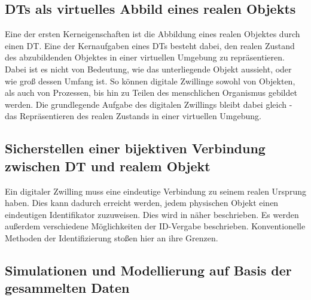 \subsection{\ac{DT}s als virtuelles Abbild eines realen Objekts}

Eine der ersten Kerneigenschaften ist die Abbildung eines realen Objektes durch einen \ac{DT}. Eine der Kernaufgaben eines \ac{DT}s besteht dabei, den realen Zustand des abzubildenden Objektes in einer virtuellen Umgebung zu repräsentieren. Dabei ist es nicht von Bedeutung, wie das unterliegende Objekt aussieht, oder wie groß dessen Umfang ist. So können digitale Zwillinge sowohl von Objekten, als auch von Prozessen, bis hin zu Teilen des menschlichen Organismus gebildet werden. Die grundlegende Aufgabe des digitalen Zwillings bleibt dabei gleich - das Repräsentieren des realen Zustands in einer virtuellen Umgebung.

\subsection{Sicherstellen einer bijektiven Verbindung zwischen \ac{DT} und realem Objekt}

Ein digitaler Zwilling muss eine eindeutige Verbindung zu seinem realen Ursprung haben. Dies kann dadurch erreicht werden, jedem physischen Objekt einen eindeutigen Identifikator zuzuweisen. Dies wird in  näher beschrieben. Es werden außerdem verschiedene Möglichkeiten der ID-Vergabe beschrieben. Konventionelle Methoden der Identifizierung stoßen hier an ihre Grenzen. \autocites{barricelli2019survey}{rios2015product}

\subsection{Simulationen und Modellierung auf Basis der gesammelten Daten}

